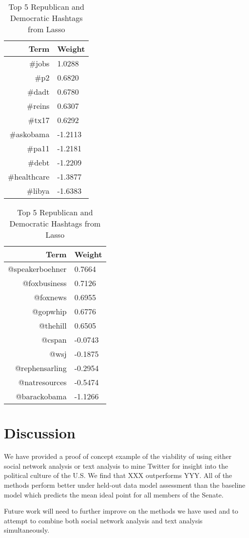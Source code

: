 \documentclass[11pt]{article}
\begin{document}
\begin{table}[htdp]
\caption{Top 5 Republican and Democratic Hashtags from Lasso}
\begin{center}
\begin{tabular}{|r|l|}
\hline
Term & Weight \\
\hline
\#jobs & 1.0288 \\
\#p2 & 0.6820 \\
\#dadt & 0.6780 \\
\#reins & 0.6307 \\
\#tx17 & 0.6292 \\
\hline
\#askobama & -1.2113 \\
\#pa11 & -1.2181 \\
\#debt & -1.2209 \\
\#healthcare & -1.3877 \\
\#libya & -1.6383 \\
\hline
\end{tabular}
\end{center}
\end{table}

\begin{table}[htdp]
\caption{Top 5 Republican and Democratic Hashtags from Lasso}
\begin{center}
\begin{tabular}{|r|l|}
\hline
Term & Weight \\
\hline
@speakerboehner & 0.7664 \\
@foxbusiness & 0.7126 \\
@foxnews & 0.6955 \\
@gopwhip & 0.6776 \\
@thehill & 0.6505 \\
\hline
@cspan & -0.0743 \\
@wsj & -0.1875 \\
@rephensarling & -0.2954 \\
@natresources & -0.5474 \\
@barackobama & -1.1266 \\
\hline
\end{tabular}
\end{center}
\end{table}

\section{Discussion}
We have provided a proof of concept example of the viability of using either social network analysis or text analysis to mine Twitter for insight into the political culture of the U.S. We find that XXX outperforms YYY. All of the methods perform better under held-out data model assessment than the baseline model which predicts the mean ideal point for all members of the Senate.

Future work will need to further improve on the methods we have used and to attempt to combine both social network analysis and text analysis simultaneously.


\newpage
{}
 
\end{document}
